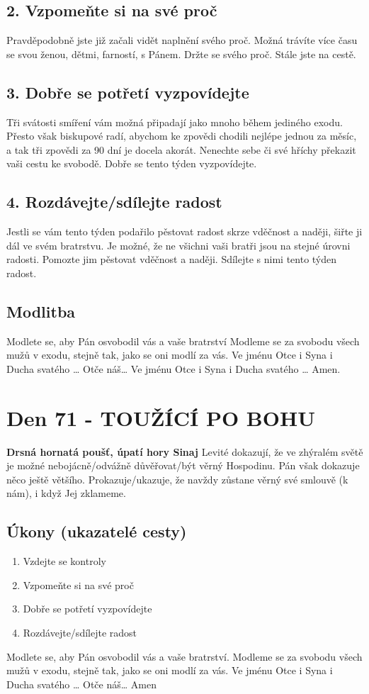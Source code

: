 \documentclass[11pt]{article}
\newcommand{\zacatekJedenactyTyden}{
\textbf{Drsná hornatá poušť, úpatí hory Sinaj} \newline 
Levité dokazují, že ve zhýralém světě je možné nebojácně/odvážně důvěřovat/být věrný Hospodinu. Pán však dokazuje něco ještě většího. Prokazuje/ukazuje, že navždy zůstane věrný své smlouvě (k nám), i když Jej zklameme.

\subsection*{Úkony (ukazatelé cesty)}
\begin{enumerate}
  \item Vzdejte se kontroly
  \item Vzpomeňte si na své proč
  \item Dobře se potřetí vyzpovídejte
  \item Rozdávejte/sdílejte radost
\end{enumerate}
Modlete se, aby Pán osvobodil vás a vaše bratrství. \newline
Modleme se za svobodu všech mužů v exodu, stejně tak, jako se oni modlí za vás.\newline
Ve jménu Otce i Syna i Ducha svatého …  Otče náš… Amen
}
\begin{document}
\subsection*{2. Vzpomeňte si na své proč}
Pravděpodobně jste již začali vidět naplnění svého proč. Možná trávíte více času se svou ženou, dětmi, farností, s Pánem. Držte se svého proč. Stále jste na cestě.
\subsection*{3. Dobře se potřetí vyzpovídejte}
Tři svátosti smíření vám možná připadají jako mnoho během jediného exodu. Přesto však biskupové radí, abychom ke zpovědi chodili nejlépe jednou za měsíc, a tak tři zpovědi za 90 dní je docela akorát. Nenechte sebe či své hříchy překazit vaši cestu ke svobodě. Dobře se tento týden vyzpovídejte.
\subsection*{4. Rozdávejte/sdílejte radost}
Jestli se vám tento týden podařilo pěstovat radost skrze vděčnost a naději, šiřte ji dál ve svém bratrstvu. Je možné, že ne všichni vaši bratři jsou na stejné úrovni radosti. Pomozte jim pěstovat vděčnost a naději. Sdílejte s nimi tento týden radost.
\subsection*{Modlitba}
Modlete se, aby Pán osvobodil vás a vaše bratrství \newline
Modleme se za svobodu všech mužů v exodu, stejně tak, jako se oni modlí za vás.\newline
Ve jménu Otce i Syna i Ducha svatého … Otče náš… Ve jménu Otce i Syna i Ducha svatého … Amen.
\newpage

\newpage
\section{Den 71 - TOUŽÍCÍ PO BOHU}
\zacatekJedenactyTyden
\end{document}

